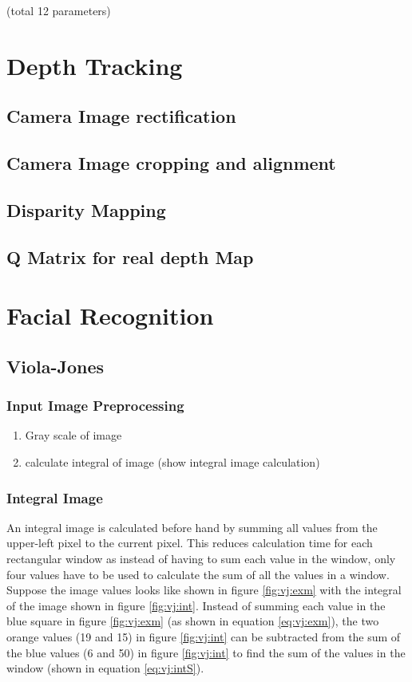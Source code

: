 \documentclass{article}
\newcommand{\imgsubsec}[2]{
    \graphicspath{ {./Images/#1/#2/} }
}
\begin{document}
(total 12 parameters)

\section{Depth Tracking}

\subsection{Camera Image rectification}
\subsection{Camera Image cropping and alignment}
\subsection{Disparity Mapping}
\subsection{Q Matrix for real depth Map}



\section{Facial Recognition}

\subsection{Viola-Jones}
\imgsubsec{FacialRecognition}{ViolaJones}

\subsubsection{Input Image Preprocessing}

\begin{enumerate}
    \item Gray scale of image
    \item calculate integral of image (show integral image calculation)
\end{enumerate}

\subsubsection{Integral Image}

An integral image is calculated before hand by summing all values from the upper-left pixel to the current pixel.  This reduces calculation time for each rectangular window as instead of having to sum each value in the window, only four values have to be used to calculate the sum of all the values in a window.  Suppose the image values looks like shown in figure \ref{fig:vj:exm} with the integral of the image shown in figure \ref{fig:vj:int}.  Instead of summing each value in the blue square in figure \ref{fig:vj:exm} (as shown in equation \ref{eq:vj:exm}), the two orange values (19 and 15) in figure \ref{fig:vj:int} can be subtracted from the sum of the blue values (6 and 50) in figure \ref{fig:vj:int} to find the sum of the values in the window (shown in equation \ref{eq:vj:intS}).
\end{document}
